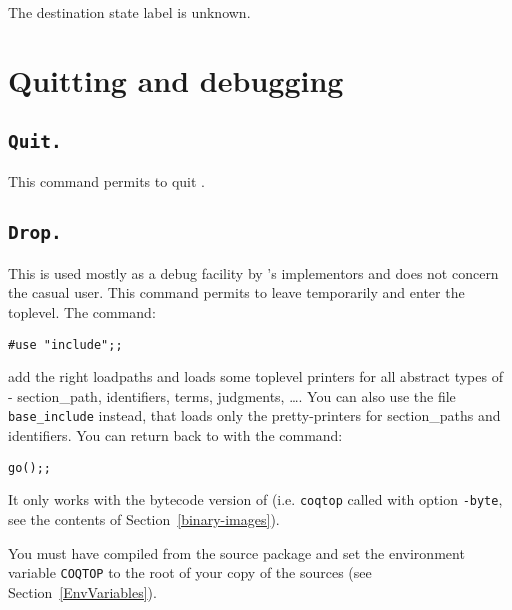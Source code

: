 \begin{ErrMsgs}
\item {} \\
  The destination state label is unknown.
\end{ErrMsgs}

\section{Quitting and debugging}

\subsection[\tt Quit.]{\tt Quit.}
This command permits to quit \Coq.

\subsection[\tt Drop.]{\tt Drop.\label{Drop}}

This is used mostly as a debug facility by \Coq's implementors
and does not concern the casual user.
This command permits to leave {\Coq} temporarily and enter the
{\ocaml} toplevel. The {\ocaml} command:

\begin{flushleft}
\begin{verbatim}
#use "include";;
\end{verbatim}
\end{flushleft}

\noindent add the right loadpaths and loads some toplevel printers for
all abstract types of \Coq - section\_path, identifiers, terms, judgments,
\dots. You can also use the file \texttt{base\_include} instead,
that loads only the pretty-printers for section\_paths and
identifiers.
You can return back to \Coq{} with the command:

\begin{flushleft}
\begin{verbatim}
go();;
\end{verbatim}
\end{flushleft}

\begin{Warnings}
\item It only works with the bytecode version of {\Coq} (i.e. {\tt coqtop} called with option {\tt -byte}, see the contents of Section~\ref{binary-images}).
\item You must have compiled {\Coq} from the source package and set the
  environment variable \texttt{COQTOP} to the root of your copy of the sources (see Section~\ref{EnvVariables}).
\end{Warnings}

